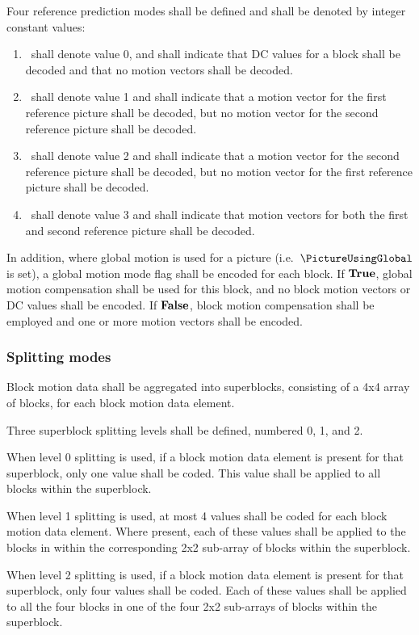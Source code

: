 Four reference prediction modes shall be defined and shall be denoted by integer
constant values: 
\begin{enumerate}
\item \Intra~shall denote value 0, and shall indicate that DC values for a block
shall be decoded and that no motion vectors shall be decoded.
\item  \RefOneOnly~shall denote value 1 and shall indicate that a motion vector
for the first reference picture shall be decoded, but no motion vector for the second
reference picture shall be decoded.
\item  \RefTwoOnly~shall denote value 2 and shall indicate that a motion vector
for the second reference picture shall be decoded, but no motion vector for the first
reference picture shall be decoded.
\item  \RefOneAndTwo~shall denote value 3 and shall indicate that motion vectors
for both the first and second reference picture shall be decoded.
\end{enumerate}

In addition, where global motion is used for a picture (i.e.\ $\PictureUsingGlobal$ is set),
a global motion mode flag shall be encoded for each block. If $\text{\bf{True}}$, global motion
compensation shall be used for this block, and no block motion vectors or DC values
shall be encoded. If $\text{\bf{False}}$, block motion compensation shall be employed and
one or more motion vectors shall be encoded.

\subsubsection{Splitting modes}

Block motion data shall be aggregated into superblocks, consisting of a 4x4 array
of blocks, for each block motion data element. 

Three superblock splitting levels shall be defined, numbered 0, 1, and 2. 

When level 0 splitting is used, if a block motion data element is
present for that superblock, only one value shall be coded. This value shall be 
applied to all blocks within the superblock.

When level 1 splitting is used, at most 4 values shall be coded for each
block motion data element. Where present, each of these values
shall be applied to the blocks in within the corresponding 2x2 sub-array of blocks
within the superblock.

When level 2 splitting is used, if a block motion data element is
present for that superblock, only four values shall be coded. Each of these values
shall be applied to all the four blocks in one of the four 2x2 sub-arrays of blocks
within the superblock.

